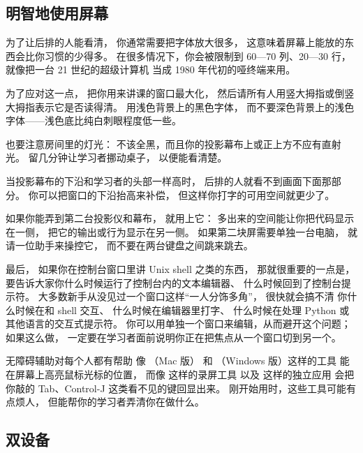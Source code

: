\subsection*{明智地使用屏幕}

为了让后排的人能看清，
你通常需要把字体放大很多，
这意味着屏幕上能放的东西会比你习惯的少得多。
在很多情况下，你会被限制到 60—70 列、20—30 行，
就像把一台 21 世纪的超级计算机
当成 1980 年代初的哑终端来用。

为了应对这一点，
把你用来讲课的窗口最大化，
然后请所有人用竖大拇指或倒竖大拇指表示它是否读得清。
用浅色背景上的黑色字体，
而不要深色背景上的浅色字体——浅色底比纯白刺眼程度低一些。

也要注意房间里的灯光：
不该全黑，而且你的投影幕布上或正上方不应有直射光。
留几分钟让学习者挪动桌子，
以便能看清楚。

当投影幕布的下沿和学习者的头部一样高时，
后排的人就看不到画面下面那部分。
你可以把窗口的下沿抬高来补偿，
但这样你打字的可用空间就更少了。

如果你能弄到第二台投影仪和幕布，
就用上它：
多出来的空间能让你把代码显示在一侧，
把它的输出或行为显示在另一侧。
如果第二块屏需要单独一台电脑，
就请一位助手来操控它，
而不要在两台键盘之间跳来跳去。

最后，
如果你在控制台窗口里讲 Unix shell 之类的东西，
那就很重要的一点是，要告诉大家你什么时候运行了控制台内的文本编辑器、
什么时候回到了控制台提示符。
大多数新手从没见过一个窗口这样“一人分饰多角”，
很快就会搞不清
你什么时候在和 shell 交互、
什么时候在编辑器里打字、
什么时候在处理 Python 或其他语言的交互式提示符。
你可以用单独一个窗口来编辑，从而避开这个问题；
如果这么做，
一定要在学习者面前说明你正在把焦点从一个窗口切到另一个。

\begin{aside}{无障碍辅助对每个人都有帮助}
  像 （Mac 版）
  和 （Windows 版）这样的工具
  能在屏幕上高亮鼠标光标的位置，
  而像  这样的录屏工具
  以及  这样的独立应用
  会把你敲的 Tab、Control-J 这类看不见的键回显出来。
  刚开始用时，这些工具可能有点烦人，
  但能帮你的学习者弄清你在做什么。
\end{aside}

\subsection*{双设备}

